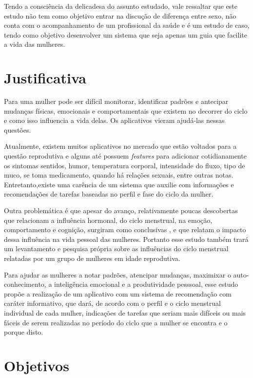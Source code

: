 Tendo a consciência da delicadesa do assunto estudado, vale ressaltar que este estudo não tem como objetivo entrar na discução de diferença entre sexo, não conta com o acompanhamento de um profissional da saúde e é um estudo de caso, tendo como objetivo desenvolver um sistema que seja apenas um guia que facilite a vida das mulheres. 

\section{Justificativa}

Para uma mulher pode ser difícil monitorar, identificar padrões e antecipar mudanças físicas, emocionais e comportamentais que existem no decorrer do ciclo e como isso influencia a vida delas. Os aplicativos vieram ajudá-las nessas questões.

Atualmente, existem muitos aplicativos no mercado que estão voltados para a questão reprodutiva e alguns até possuem \textit{features} para adicionar cotidianamente os sintomas sentidos, humor, temperatura corporal, intensidade do fluxo, tipo de muco, se toma medicamento, quando há relações sexuais, entre outras notas. Entretanto,existe uma carência de um sistema que auxilie com informações e recomendações de tarefas baseadas no perfil e fase do ciclo da mulher.

Outra problemática é que apesar do avanço, relativamente poucas descobertas que relacionam a influência hormonal, do ciclo menstrual, na emoção, comportamento e cognição, surgiram como conclusivas \cite{poroma2014}, e que relatam o impacto dessa influência na vida pessoal das mulheres. Portanto esse estudo também trará um levantamento e pesquisa própria sobre as influências do ciclo menstrual relatadas por um grupo de mulheres em idade reprodutiva.

Para ajudar as mulheres a notar padrões, atencipar mudanças, maximixar o auto-conhecimento, a inteligência emocional e a produtividade pesssoal, esse estudo propõe a realização de um aplicativo com um sistema de recomendação com caráter informativo, que dará, de acordo com o perfil e o ciclo menstrual individual de cada mulher, indicações de tarefas que seriam mais difíceis ou mais fáceis de serem realizadas no período do ciclo que a mulher se encontra e o porque disto.



\section{Objetivos}

